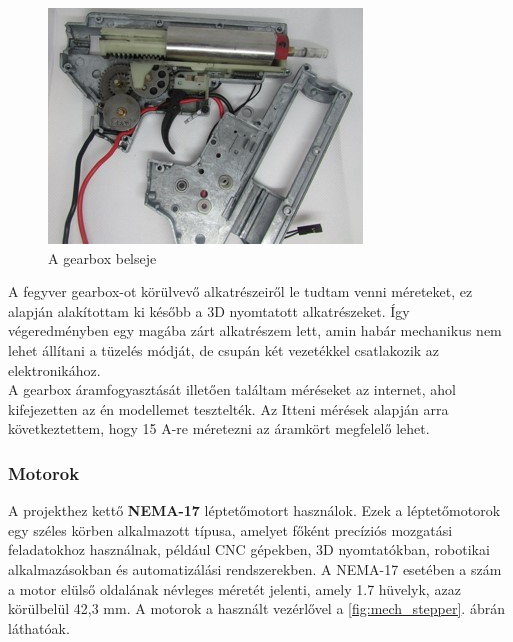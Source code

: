 \documentclass[12pt,a4paper]{article}
\begin{document}
\begin{figure}[h!]
	\centering
	\includegraphics[width=0.6\linewidth]{gearboxbele}
	\caption{A gearbox belseje\cite{airsoft}}
	\label{fig:gearboxbele}
\end{figure}

A fegyver gearbox-ot körülvevő alkatrészeiről le tudtam venni méreteket, ez alapján alakítottam ki később a 3D nyomtatott alkatrészeket. Így végeredményben egy magába zárt alkatrészem lett, amin habár mechanikus nem lehet állítani a tüzelés módját, de csupán két vezetékkel csatlakozik az elektronikához. \\

A gearbox áramfogyasztását illetően találtam méréseket az internet, ahol kifejezetten az én modellemet tesztelték. Az Itteni mérések alapján arra következtettem, hogy 15 A-re méretezni az áramkört megfelelő lehet. \cite{airsoftteszt}

\subsubsection*{Motorok}

A projekthez kettő \textbf{NEMA-17} léptetőmotort használok\cite{nema17}. Ezek a léptetőmotorok egy széles körben alkalmazott típusa, amelyet főként precíziós mozgatási feladatokhoz használnak, például CNC gépekben, 3D nyomtatókban, robotikai alkalmazásokban és automatizálási rendszerekben. A NEMA-17 esetében a szám a motor elülső oldalának névleges méretét jelenti, amely 1.7 hüvelyk, azaz körülbelül 42,3 mm. A motorok a használt vezérlővel a \ref{fig:mech_stepper}. ábrán láthatóak.\\
\end{document}
